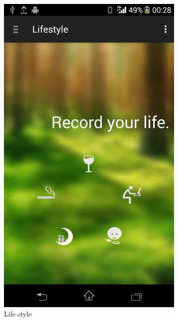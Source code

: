 \begin{figure}
\begin{subfigure}{.24\textwidth}
  \includegraphics[width=.8\linewidth]{img/screenshot/ss9.png}
  \caption{Life style}
\end{subfigure}
\begin{subfigure}{.24\textwidth}
  \centering

\end{subfigure}
\end{figure}
